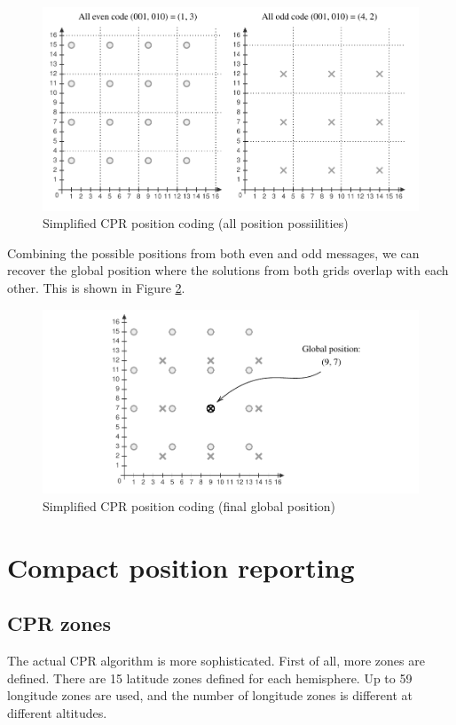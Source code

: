 \begin{figure}[!ht]
  \includegraphics[width=0.9\linewidth]{figures/adsb/cpr_simple_2.pdf}
  \caption{Simplified CPR position coding (all position possiilities)}
  \label{fig:cpr_simple_2}
\end{figure}

Combining the possible positions from both even and odd messages, we can recover the global position where the solutions from both grids overlap with each other. This is shown in Figure \ref{fig:cpr_simple_3}.

\begin{figure}[!ht]
  \includegraphics[width=0.9\linewidth]{figures/adsb/cpr_simple_3.pdf}
  \caption{Simplified CPR position coding (final global position)}
  \label{fig:cpr_simple_3}
\end{figure}

\newpage

\section{Compact position reporting}

\subsection{CPR zones}
The actual CPR algorithm is more sophisticated. First of all, more zones are defined. There are 15 latitude zones defined for each hemisphere. Up to 59 longitude zones are used, and the number of longitude zones is different at different altitudes.

